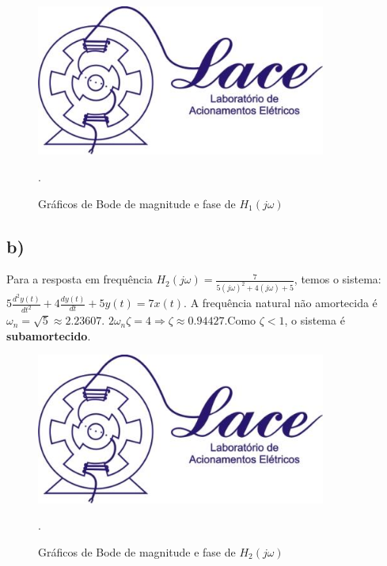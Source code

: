 \documentclass{article}[a4paper,12pt,twoside]
\begin{document}
\begin{figure}[H]
    \centering
    \includegraphics[width=0.85\textwidth]{a}
    \caption{Gráficos de Bode de magnitude e fase de $H_1(j\omega)$}.
    \label{fig:my_label}
\end{figure}

\subsection{b)}
Para a resposta em frequência $H_2(j\omega)=\frac{7}{5(j\omega)^2+4(j\omega)+5}$, temos o sistema:\\
$5\frac{d^2y(t)}{dt^2}+4\frac{dy(t)}{dt}+5y(t)=7x(t)$.\newline
\newline
A frequência natural não amortecida é $\omega_n = \sqrt{5} \approx 2.23607$.
\newline
$2\omega_n\zeta=4 \Longrightarrow \zeta \approx 0.94427$.Como $\zeta<1$, o sistema é \textbf{subamortecido}.

\begin{figure}[H]
    \centering
    \includegraphics[width=0.85\textwidth]{a}
    \caption{Gráficos de Bode de magnitude e fase de $H_2(j\omega)$}.
    \label{fig:my_label}
\end{figure}
\end{document}
